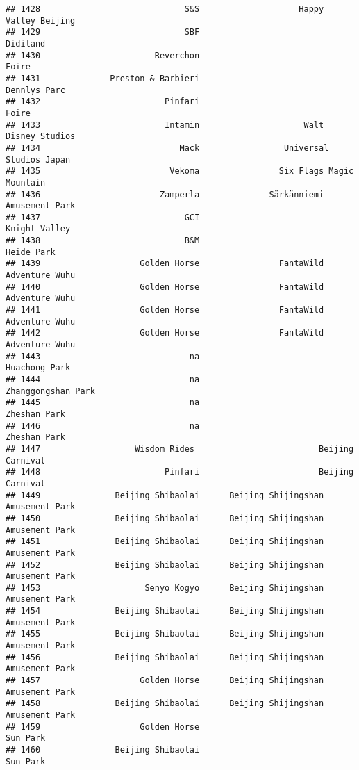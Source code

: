 \documentclass[
]{article}
\begin{document}
\begin{verbatim}
## 1428                             S&S                    Happy Valley Beijing
## 1429                             SBF                                Didiland
## 1430                       Reverchon                                   Foire
## 1431              Preston & Barbieri                            Dennlys Parc
## 1432                         Pinfari                                   Foire
## 1433                         Intamin                     Walt Disney Studios
## 1434                            Mack                 Universal Studios Japan
## 1435                          Vekoma                Six Flags Magic Mountain
## 1436                        Zamperla              Särkänniemi Amusement Park
## 1437                             GCI                           Knight Valley
## 1438                             B&M                              Heide Park
## 1439                    Golden Horse                FantaWild Adventure Wuhu
## 1440                    Golden Horse                FantaWild Adventure Wuhu
## 1441                    Golden Horse                FantaWild Adventure Wuhu
## 1442                    Golden Horse                FantaWild Adventure Wuhu
## 1443                              na                           Huachong Park
## 1444                              na                      Zhanggongshan Park
## 1445                              na                            Zheshan Park
## 1446                              na                            Zheshan Park
## 1447                   Wisdom Rides                         Beijing Carnival
## 1448                         Pinfari                        Beijing Carnival
## 1449               Beijing Shibaolai      Beijing Shijingshan Amusement Park
## 1450               Beijing Shibaolai      Beijing Shijingshan Amusement Park
## 1451               Beijing Shibaolai      Beijing Shijingshan Amusement Park
## 1452               Beijing Shibaolai      Beijing Shijingshan Amusement Park
## 1453                     Senyo Kogyo      Beijing Shijingshan Amusement Park
## 1454               Beijing Shibaolai      Beijing Shijingshan Amusement Park
## 1455               Beijing Shibaolai      Beijing Shijingshan Amusement Park
## 1456               Beijing Shibaolai      Beijing Shijingshan Amusement Park
## 1457                    Golden Horse      Beijing Shijingshan Amusement Park
## 1458               Beijing Shibaolai      Beijing Shijingshan Amusement Park
## 1459                    Golden Horse                                Sun Park
## 1460               Beijing Shibaolai                                Sun Park

\end{verbatim}
\end{document}
